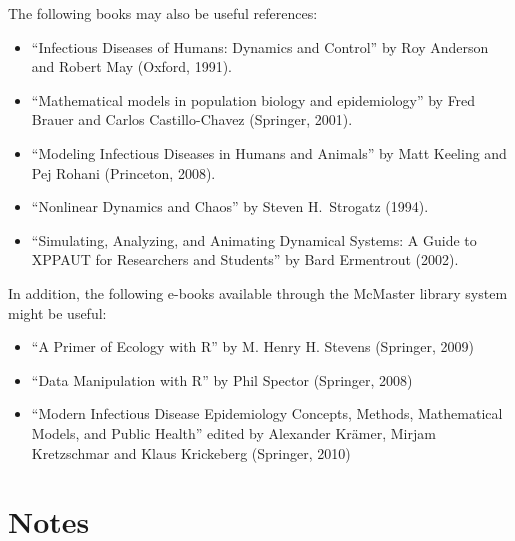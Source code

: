 \documentclass[12pt]{article}
\begin{document}
The following books may also be useful references:
\vspace{-0.25cm}
\begin{itemize}\addtolength{\itemsep}{-0.5\baselineskip}
\item ``Infectious Diseases of Humans: Dynamics and Control'' by Roy Anderson and Robert May (Oxford, 1991).

\item ``Mathematical models in population biology and epidemiology'' by Fred Brauer
and Carlos Castillo-Chavez (Springer, 2001).

\item ``Modeling Infectious Diseases in Humans and Animals'' by Matt Keeling and Pej Rohani (Princeton, 2008).

\item ``Nonlinear Dynamics and Chaos'' by Steven H.\ Strogatz (1994).

\item ``Simulating, Analyzing, and Animating Dynamical Systems: A Guide to XPPAUT for Researchers and Students'' by Bard Ermentrout (2002).

\end{itemize}
In addition, the following e-books available through the McMaster library system might be useful:
\begin{itemize}\addtolength{\itemsep}{-0.5\baselineskip}

\item ``A Primer of Ecology with R'' by M. Henry H. Stevens (Springer, 2009)

\item ``Data Manipulation with R'' by Phil Spector (Springer, 2008)

\item ``Modern Infectious Disease Epidemiology Concepts, Methods, Mathematical Models, and Public Health'' edited by Alexander Kr\"amer, Mirjam Kretzschmar and Klaus Krickeberg (Springer, 2010)

\end{itemize}

\section*{Notes}
\end{document}

